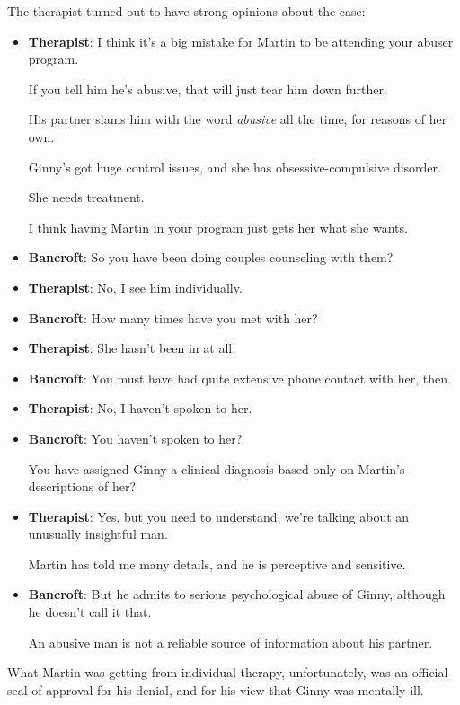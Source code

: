 \documentclass[oneside]{article}
\numberwithin{equation}{section}
\begin{document}
The therapist turned out to have strong opinions about the case:
\begin{itemize}
    \item \textbf{Therapist}: I think it's a big mistake for Martin to be attending your abuser program.
    
    
    If you tell him he's abusive, that will just tear him down further.
    
    His partner slams him with the word \textit{abusive} all the time, for reasons of her own.
    
    Ginny's got huge control issues, and she has obsessive-compulsive disorder.
    
    She needs treatment.
    
    I think having Martin in your program just gets her what she wants.
    \item \textbf{Bancroft}: So you have been doing couples counseling with them?
    \item \textbf{Therapist}: No, I see him individually.
    \item \textbf{Bancroft}: How many times have you met with her?
    \item \textbf{Therapist}: She hasn't been in at all.
    \item \textbf{Bancroft}: You must have had quite extensive phone contact with her, then.
    \item \textbf{Therapist}: No, I haven't spoken to her.
    \item \textbf{Bancroft}: You haven't spoken to her?
    
    You have assigned Ginny a clinical diagnosis based only on Martin's descriptions of her?
    \item \textbf{Therapist}: Yes, but you need to understand, we're talking about an unusually insightful man.
    
    Martin has told me many details, and he is perceptive and sensitive.
    \item \textbf{Bancroft}: But he admits to serious psychological abuse of Ginny, although he doesn't call it that.
    
    An abusive man is not a reliable source of information about his partner.
\end{itemize}
What Martin was getting from individual therapy, unfortunately, was an official seal of approval for his denial, and for his view that Ginny was mentally ill.
\end{document}
